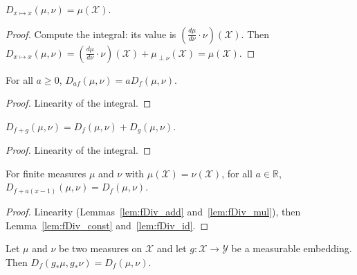 \begin{lemma}
  \label{lem:fDiv_id}
  $D_{x \mapsto x}(\mu, \nu) = \mu(\mathcal X)$.
\end{lemma}

\begin{proof} %
Compute the integral: its value is $(\frac{d\mu}{d\nu}\cdot \nu)(\mathcal X)$. Then
$D_{x\mapsto x}(\mu, \nu) = (\frac{d\mu}{d\nu}\cdot \nu)(\mathcal X) + \mu_{\perp \nu}(\mathcal X) = \mu (\mathcal X)$.
\end{proof}


\begin{lemma}
  \label{lem:fDiv_mul}
  \leanok
  For all $a \ge 0$, $D_{a f}(\mu, \nu) = a D_{f}(\mu, \nu)$.
\end{lemma}

\begin{proof}\leanok
Linearity of the integral.
\end{proof}


\begin{lemma}
  \label{lem:fDiv_add}
  \leanok
  $D_{f + g}(\mu, \nu) = D_f(\mu, \nu) + D_g(\mu, \nu)$.
\end{lemma}

\begin{proof}\leanok
Linearity of the integral.
\end{proof}


\begin{lemma}
  \label{lem:fDiv_add_linear}
  For finite measures $\mu$ and $\nu$ with $\mu(\mathcal X) = \nu(\mathcal X)$, for all $a \in \mathbb{R}$, $D_{f + a(x - 1)}(\mu, \nu) = D_{f}(\mu, \nu)$.
\end{lemma}

\begin{proof}%
{}
Linearity (Lemmas~\ref{lem:fDiv_add} and~\ref{lem:fDiv_mul}), then Lemma~\ref{lem:fDiv_const} and~\ref{lem:fDiv_id}.
\end{proof}


\begin{lemma}
  \label{lem:fDiv_map_measurableEmbedding}
  \leanok
  Let $\mu$ and $\nu$ be two measures on $\mathcal X$ and let $g : \mathcal X \to \mathcal Y$ be a measurable embedding. Then $D_f(g_* \mu, g_* \nu) = D_f(\mu, \nu)$.
\end{lemma}

